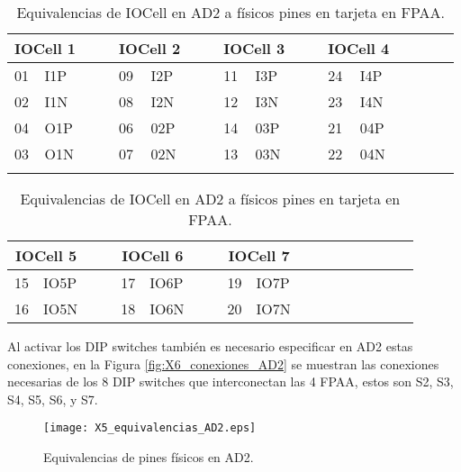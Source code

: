 	\begin{table}[!ht]                                      
		\centering   
		\caption{Equivalencias de IOCell en AD2 a físicos pines en tarjeta en FPAA.}                            
		\label{tab:IOresumen}                                        
			\begin{tabular}{ll cc ll cc ll cc ll cc ll}                        
			\hline                                              
			\multicolumn{2}{c}{IOCell 1} &&& \multicolumn{2}{c}{IOCell 2} &&& \multicolumn{2}{c}{IOCell 3}	&&& \multicolumn{2}{c}{IOCell 4}\\            
			\hline                                              
			01	& I1P	&&&	09	& I2P	&&&	11	& I3P	&&&	24	& I4P	\\  
			02	& I1N	&&&	08	& I2N	&&&	12	& I3N	&&&	23	& I4N	\\
			04	& O1P	&&&	06	& 02P	&&&	14	& 03P	&&&	21	& 04P	\\
			03	& O1N	&&&	07	& 02N	&&&	13	& 03N	&&&	22	& 04N	\\
			\hline
				&&&&&&&&&&&&& 	\\                                 
			\end{tabular}
		
			\begin{tabular}{ll cc ll cc ll cc ll cc ll}                        
			\hline                                              
			\multicolumn{2}{c}{IOCell 5} &&& \multicolumn{2}{c}{IOCell 6} &&& \multicolumn{2}{c}{IOCell 7}	\\            
			\hline                                              
			15	& IO5P	&&&	17	& IO6P	&&&	19	& IO7P	\\  
			16	& IO5N	&&&	18	& IO6N	&&&	20	& IO7N	\\
			\hline                                 
			\end{tabular}                                                             
	\end{table}
	
	Al activar los DIP switches también es necesario especificar en AD2 estas conexiones, en la Figura \ref{fig:X6_conexiones_AD2} se muestran las conexiones necesarias de los 8 DIP switches que interconectan las 4 FPAA, estos son S2, S3, S4, S5, S6, y S7.
	
	
	\begin{figure}[!h]
		\caption{Equivalencias de pines físicos en AD2.}
		\label{fig:X5_equivalencias_AD2}
		\centering
		\texttt{[image: X5\_equivalencias\_AD2.eps]}
	\end{figure}
	
